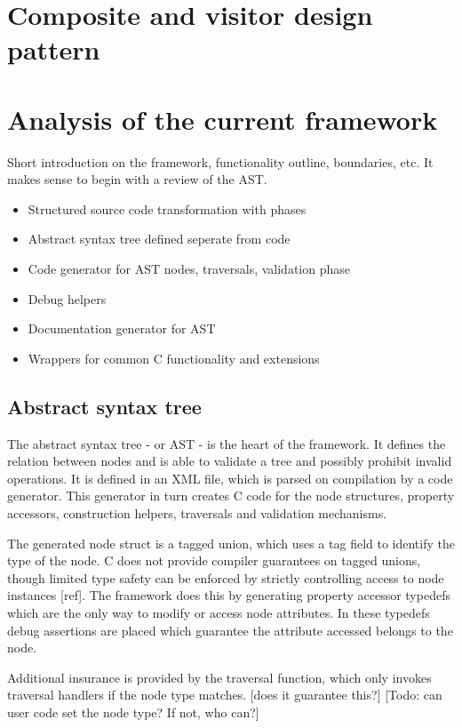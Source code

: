 \documentclass[final,a4paper,12pt]{article}
\begin{document}
\section*{Composite and visitor design pattern}



\section{Analysis of the current framework}
Short introduction on the framework, functionality outline, boundaries, etc. It makes sense to begin with a review of the AST.
\begin{itemize}
	\item Structured source code transformation with phases
	\item Abstract syntax tree defined seperate from code
	\item Code generator for AST nodes, traversals, validation phase
	\item Debug helpers
	\item Documentation generator for AST
	\item Wrappers for common C functionality and extensions
\end{itemize}

\subsection{Abstract syntax tree}
The abstract syntax tree - or AST - is the heart of the framework. It defines the relation between nodes and is able to validate a tree and possibly prohibit invalid operations. It is defined in an XML file, which is parsed on compilation by a code generator. This generator in turn creates C code for the node structures, property accessors, construction helpers, traversals and validation mechanisms.

The generated node struct is a tagged union, which uses a tag field to identify the type of the node. C does not provide compiler guarantees on tagged unions, though limited type safety can be enforced by strictly controlling access to node instances [ref]. The  framework does this by generating property accessor typedefs which are the only way to modify or access node attributes. In these typedefs debug assertions are placed which guarantee the attribute accessed belongs to the node.

Additional insurance is provided by the traversal function, which only invokes traversal handlers if the node type matches. [does it guarantee this?] [Todo: can user code set the node type? If not, who can?]
\end{document}
